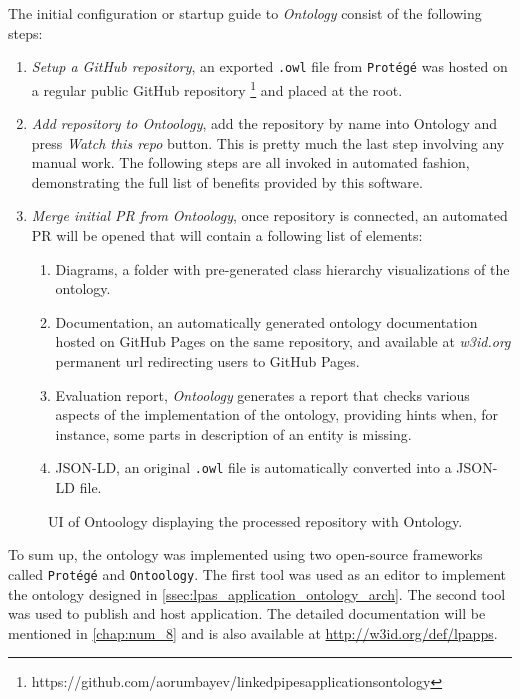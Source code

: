 The initial configuration or startup guide to \textit{Ontology} consist of the following steps: 
\begin{enumerate}
	\item \textit{Setup a GitHub repository}, an exported \texttt{.owl} file from \texttt{Protégé} was hosted on a regular public GitHub repository \footnote{https://github.com/aorumbayev/linkedpipesapplicationsontology} and placed at the root.
	\item \textit{Add repository to Ontoology}, add the repository by name into Ontology and press \textit{Watch this repo} button. This is pretty much the last step involving any manual work. The following steps are all invoked in automated fashion, demonstrating the full list of benefits provided by this software.
	\item \textit{Merge initial PR from Ontoology}, once repository is connected, an automated PR will be opened that will contain a following list of elements:
	\begin{enumerate}
		\item Diagrams, a folder with pre-generated class hierarchy visualizations of the ontology.
		\item Documentation, an automatically generated ontology documentation hosted on GitHub Pages on the same repository, and available at \textit{w3id.org} permanent url redirecting users to GitHub Pages.
		\item Evaluation report, \textit{Ontoology} generates a report that checks various aspects of the implementation of the ontology, providing hints when, for instance, some parts in description of an entity is missing.
		\item JSON-LD, an original \texttt{.owl} file is automatically converted into a JSON-LD file.  
	\end{enumerate}
\end{enumerate}

\begin{figure}[h]
\centering
{}
\caption{UI of Ontoology displaying the processed repository with \lpas{} Ontology.}
\label{fig:misc_ontoology_ui}
\end{figure}

To sum up, the \lpas{} ontology was implemented using two open-source frameworks called \texttt{Protégé} and \texttt{Ontoology}. The first tool was used as an editor to implement the ontology designed in \autoref{ssec:lpas_application_ontology_arch}. The second tool was used to publish and host application. The detailed documentation will be mentioned in \autoref{chap:num_8} and is also available at \url{http://w3id.org/def/lpapps}. 

